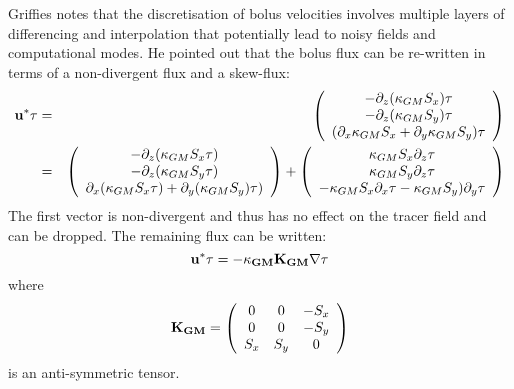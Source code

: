 \documentclass[12pt]{article}
\begin{document}
Griffies notes that the discretisation of bolus velocities involves
multiple layers of differencing and interpolation that potentially
lead to noisy fields and computational modes. He pointed out that the
bolus flux can be re-written in terms of a non-divergent flux and a
skew-flux:
\begin{eqnarray*}
\bf{u}^* \tau
& = &
\left( \begin{array}{c}
- \partial_z ( \kappa_{GM} S_x ) \tau \\
- \partial_z ( \kappa_{GM} S_y ) \tau \\
(\partial_x \kappa_{GM} S_x + \partial_y \kappa_{GM} S_y)\tau
\end{array} \right)
\\
& = &
\left( \begin{array}{c}
- \partial_z ( \kappa_{GM} S_x \tau) \\
- \partial_z ( \kappa_{GM} S_y \tau) \\
\partial_x ( \kappa_{GM} S_x \tau) + \partial_y ( \kappa_{GM} S_y) \tau)
\end{array} \right)
+ \left( \begin{array}{c}
 \kappa_{GM} S_x \partial_z \tau \\
 \kappa_{GM} S_y \partial_z \tau \\
- \kappa_{GM} S_x \partial_x \tau - \kappa_{GM} S_y) \partial_y \tau
\end{array} \right)
\end{eqnarray*}
The first vector is non-divergent and thus has no effect on the tracer
field and can be dropped. The remaining flux can be written:
\begin{equation}
\bf{u}^* \tau = - \kappa_{GM} \bf{K}_{GM} \bf{\nabla} \tau
\end{equation}
where
\begin{equation}
\bf{K}_{GM} =
\left(
\begin{array}{ccc}
0 & 0 & -S_x \\
0 & 0 & -S_y \\
S_x & S_y & 0
\end{array}
\right)
\end{equation}
is an anti-symmetric tensor.
\end{document}
